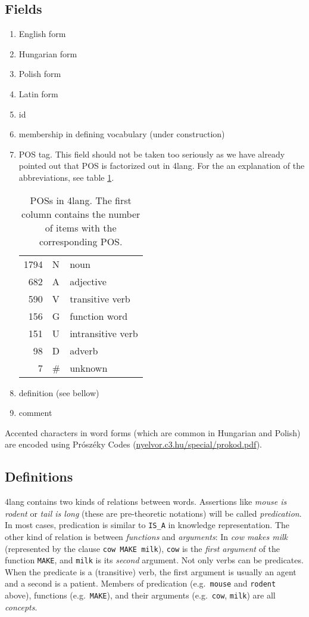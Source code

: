 \documentclass[a4paper,10pt]{article}
\begin{document}
\subsection{Fields}
\begin{enumerate}
 \item English form
\item Hungarian form
\item Polish form
\item Latin form
\item id
\item membership in defining vocabulary (under construction)
\item POS tag. This field should not be taken too seriously as we have already pointed out that POS is factorized out in 4lang. For the an explanation of the abbreviations, see table \ref{table_pos}.
\begin{table}[h]
\begin{center}
\begin{tabular}{rll}
\toprule 
1794	& N & noun
\\ 682	& A & adjective
\\ 590	& V & transitive verb
\\ 156	& G & function word
\\ 151	& U & intransitive verb
\\ 98	& D & adverb
\\ 7	& \# & unknown
\\\bottomrule
\end{tabular}
\end{center}
\caption{POSs in 4lang. The first column contains the number of items with the corresponding POS.}
\label{table_pos}
\end{table}
\item definition (see bellow)
\item comment
\end{enumerate}
Accented characters in word forms (which are common in Hungarian and Polish) are encoded using Prószéky Codes (\url{nyelvor.c3.hu/special/prokod.pdf}).
\subsection{Definitions}
4lang contains two kinds of relations between words. Assertions like \emph{mouse is rodent} or \emph{tail is long} (these are pre-theoretic notations) will be called \emph{predication}. In most cases, predication is similar to \texttt{IS\_A} in knowledge representation. The other kind of relation is between \emph{functions} and \emph{arguments}: In \emph{cow makes milk} (represented by the clause \texttt{cow MAKE milk}), \texttt{cow} is the \emph{first argument} of the function \texttt{MAKE}, and \texttt{milk} is its \emph{second} argument. Not only verbs can be predicates. When the predicate is a (transitive) verb, the first argument is usually an agent and a second is a patient. Members of predication (e.g.\ \texttt{mouse} and \texttt{rodent} above), functions (e.g.\ \texttt{MAKE}), and their arguments (e.g.\ \texttt{cow}, \texttt{milk}) are all \emph{concepts}.
\end{document}
